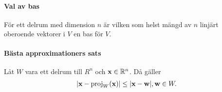 \proof

\paragraph{Val av bas}
För ett delrum med dimension $n$ är vilken som helst mängd av $n$ linjärt oberoende vektorer i $V$ en bas för $V$.

\proof

\paragraph{Bästa approximationers sats}
Låt $W$ vara ett delrum till $R^n$ och $\vect{x}\in\R^n$. Då gäller
\begin{align*}
	\abs{\vect{x} - \proj{W}{\vect{x}}} \leq \abs{\vect{x} - \vect{w}}, \vect{w}\in W.
\end{align*}

\proof